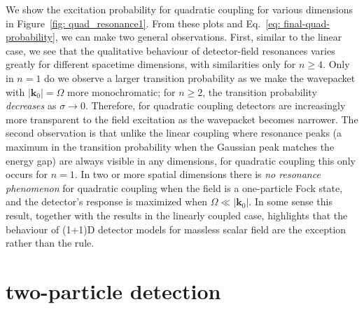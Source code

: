 \documentclass[prd,twocolumn,superscriptaddress,nofootinbib,floatfix,amsmath,amssymb]{revtex4-2}
\newcommand{\bk}{{\bm{k}}}
\begin{document}
    We show the excitation probability for quadratic coupling for various dimensions in Figure~\ref{fig: quad_resonance1}. From these plots and  Eq.~\eqref{eq: final-quad-probability}, we can make two general observations. First, similar to the linear case, we see that the qualitative behaviour of detector-field resonances varies greatly for different spacetime dimensions, with similarities only for $n\geq 4$. Only in $n=1$ do we observe a larger transition probability as we make the wavepacket with $|\bm k_0|=\Omega$ more monochromatic; for $n\geq 2$, the transition probability \textit{decreases} as $\sigma\to 0$. Therefore, for quadratic coupling detectors are increasingly more transparent to the field excitation as the wavepacket becomes narrower. The second observation is that unlike the linear coupling where resonance peaks (a maximum in the transition probability when the Gaussian peak matches the energy gap) are always visible in any dimensions, for quadratic coupling this only occurs for $n=1$. In two or more spatial dimensions there is \textit{no resonance phenomenon} for quadratic coupling when the field is a one-particle Fock state, and the detector's response is maximized when $\Omega\ll |\bk_0|$. In some sense this result, together with the results in the linearly coupled case, highlights that the behaviour of (1+1)D detector models for massless scalar field are the exception rather than the rule.
    	
       
    
    
    
    
    
    
    
    
    
    
    
    
    
    
    
    

















    \section{two-particle detection}
    \label{sec:twoparticle}
    
\end{document}
